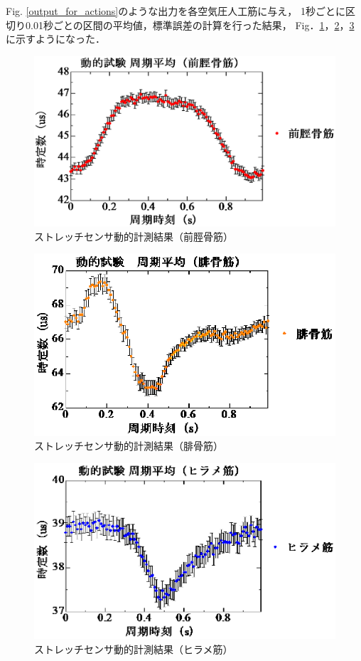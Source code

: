 Fig. \ref{output_for_actions}のような出力を各空気圧人工筋に与え，
1秒ごとに区切り0.01秒ごとの区間の平均値，標準誤差の計算を行った結果，
Fig．\ref{zenkei_action}，\ref{hikotsu_action}，\ref{hirame_action}に示すようになった．
\begin{figure}[h]
  \begin{center}
  \includegraphics[width=0.75\columnwidth,clip]{./4_consideration/moving/zenkei.eps}
  \caption{ストレッチセンサ動的計測結果（前脛骨筋）}
  \label{zenkei_action}
  \end{center}
\end{figure}
\begin{figure}[h]
  \begin{center}
  \includegraphics[width=0.75\columnwidth,clip]{./4_consideration/moving/hikotsu.eps}
  \caption{ストレッチセンサ動的計測結果（腓骨筋）}
  \label{hikotsu_action}
  \end{center}
\end{figure}

\clearpage

\begin{figure}[h]
  \begin{center}
  \includegraphics[width=0.75\columnwidth,clip]{./4_consideration/moving/hirame.eps}
  \caption{ストレッチセンサ動的計測結果（ヒラメ筋）}
  \label{hirame_action}
  \end{center}
\end{figure}

